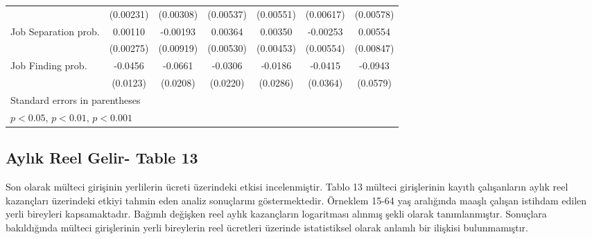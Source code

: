\documentclass{article}
\begin{document}
{\begin{tabular}{l*{6}{c}}
            &   (0.00231)         &   (0.00308)         &   (0.00537)         &   (0.00551)         &   (0.00617)         &   (0.00578)         \\
[1em]
Job Separation prob.         &     0.00110         &    -0.00193         &     0.00364         &     0.00350         &    -0.00253         &     0.00554         \\
            &   (0.00275) &   (0.00919)  &   (0.00530)   &  (0.00453)  &   (0.00554) &   (0.00847)         \\
[1em]
Job Finding prob.         &     -0.0456\sym{***}&     -0.0661\sym{**} &     -0.0306         &     -0.0186         &     -0.0415         &     -0.0943         \\
            &    (0.0123)         &    (0.0208)         &    (0.0220)         &    (0.0286)         &    (0.0364)         &    (0.0579)         \\
\hline

\hline\hline
\multicolumn{7}{l}{\footnotesize Standard errors in parentheses}\\
\multicolumn{7}{l}{\footnotesize \sym{*} \(p<0.05\), \sym{**} \(p<0.01\), \sym{***} \(p<0.001\)}\\
\end{tabular}
}
\newpage
    \subsection*{Aylık Reel Gelir- Table 13}
    Son olarak mülteci girişinin yerlilerin ücreti üzerindeki etkisi incelenmiştir. Tablo 13 mülteci girişlerinin kayıtlı çalışanların aylık reel kazançları üzerindeki etkiyi tahmin eden analiz sonuçlarını göstermektedir. Örneklem 15-64 yaş aralığında maaşlı çalışan istihdam edilen yerli bireyleri kapsamaktadır. Bağımlı değişken reel aylık kazançların logaritması alınmış şekli olarak tanımlanmıştır.  Sonuçlara bakıldığında mülteci girişlerinin yerli bireylerin reel ücretleri üzerinde istatistiksel olarak anlamlı bir ilişkisi bulunmamıştır. 
\end{document}
